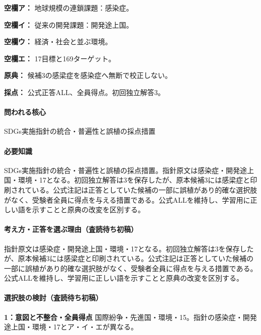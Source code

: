 \noindent\textbf{空欄ア：} 地球規模の連鎖課題：感染症。\par

\noindent\textbf{空欄イ：} 従来の開発課題：開発途上国。\par

\noindent\textbf{空欄ウ：} 経済・社会と並ぶ環境。\par

\noindent\textbf{空欄エ：} 17目標と169ターゲット。\par

\noindent\textbf{原典：} 候補3の感梁症を感染症へ無断で校正しない。\par

\noindent\textbf{採点：} 公式正答ALL、全員得点。初回独立解答3。\par

\paragraph{問われる核心} SDGs実施指針の統合・普遍性と誤植の採点措置

\paragraph{必要知識} SDGs実施指針の統合・普遍性と誤植の採点措置。指針原文は感染症・開発途上国・環境・17となる。初回独立解答は3を保存したが、原本候補3には感梁症と印刷されている。公式注記は正答としていた候補の一部に誤植があり的確な選択肢がなく、受験者全員に得点を与える措置である。公式ALLを維持し、学習用に正しい語を示すことと原典の改変を区別する。

\paragraph{考え方・正答を選ぶ理由（査読待ち初稿）} 指針原文は感染症・開発途上国・環境・17となる。初回独立解答は3を保存したが、原本候補3には感梁症と印刷されている。公式注記は正答としていた候補の一部に誤植があり的確な選択肢がなく、受験者全員に得点を与える措置である。公式ALLを維持し、学習用に正しい語を示すことと原典の改変を区別する。

\paragraph{選択肢の検討（査読待ち初稿）}\mbox{}\par

\noindent\textbf{1：意図と不整合・全員得点} 国際紛争・先進国・環境・15。指針の感染症・開発途上国・環境・17とア・イ・エが異なる。\par

